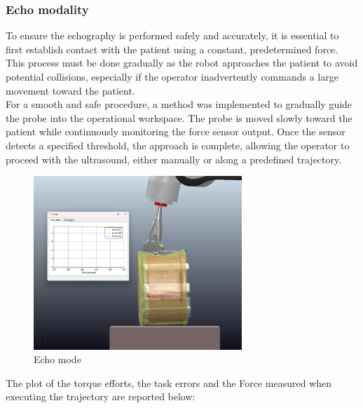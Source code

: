 \documentclass{article}
\begin{document}
\subsubsection{Echo modality}
To ensure the echography is performed safely and accurately, it is essential to first establish contact with the patient using a constant, predetermined force. This process must be done gradually as the robot approaches the patient to avoid potential collisions, especially if the operator inadvertently commands a large movement toward the patient.\\
For a smooth and safe procedure, a method was implemented to gradually guide the probe into the operational workspace. The probe is moved slowly toward the patient while continuously monitoring the force sensor output. Once the sensor detects a specified threshold, the approach is complete, allowing the operator to proceed with the ultrasound, either manually or along a predefined trajectory.
\begin{figure}[H]
    \centering
    \includegraphics[width=0.7\textwidth]{Echo_mode.png}  
    \caption{Echo mode}
    \label{Echo}
\end{figure}
\hspace{-0.53cm}The plot of the torque efforts, the task errors and the Force measured when executing the trajectory are reported below:
\end{document}
